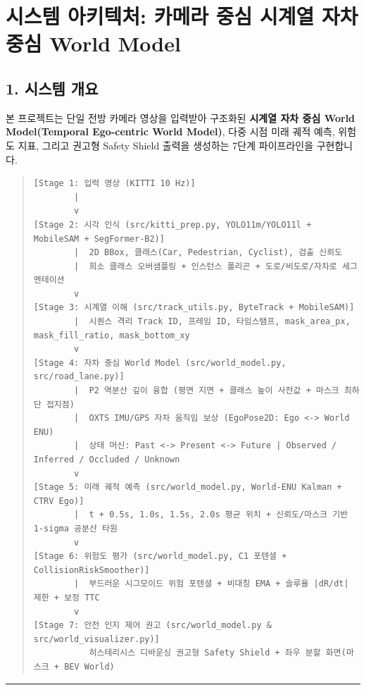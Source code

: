 \documentclass[10.5pt,a4paper]{article}
\begin{document}
\section{시스템 아키텍처: 카메라 중심 시계열 자차 중심 World Model}

\subsection{1. 시스템 개요}

본 프로젝트는 단일 전방 카메라 영상을 입력받아 구조화된 \textbf{시계열 자차 중심 World Model(Temporal Ego-centric World Model)}, 다중 시점 미래 궤적 예측, 위험도 지표, 그리고 권고형 Safety Shield 출력을 생성하는 7단계 파이프라인을 구현합니다.


\begin{quote}\begin{footnotesize}\begin{verbatim}
[Stage 1: 입력 영상 (KITTI 10 Hz)]
        |
        v
[Stage 2: 시각 인식 (src/kitti_prep.py, YOLO11m/YOLO11l + MobileSAM + SegFormer-B2)]
        |  2D BBox, 클래스(Car, Pedestrian, Cyclist), 검출 신뢰도
        |  희소 클래스 오버샘플링 + 인스턴스 폴리곤 + 도로/비도로/자차로 세그멘테이션
        v
[Stage 3: 시계열 이해 (src/track_utils.py, ByteTrack + MobileSAM)]
        |  시퀀스 격리 Track ID, 프레임 ID, 타임스탬프, mask_area_px, mask_fill_ratio, mask_bottom_xy
        v
[Stage 4: 자차 중심 World Model (src/world_model.py, src/road_lane.py)]
        |  P2 역분산 깊이 융합 (평면 지면 + 클래스 높이 사전값 + 마스크 최하단 접지점)
        |  OXTS IMU/GPS 자차 움직임 보상 (EgoPose2D: Ego <-> World ENU)
        |  상태 머신: Past <-> Present <-> Future | Observed / Inferred / Occluded / Unknown
        v
[Stage 5: 미래 궤적 예측 (src/world_model.py, World-ENU Kalman + CTRV Ego)]
        |  t + 0.5s, 1.0s, 1.5s, 2.0s 평균 위치 + 신뢰도/마스크 기반 1-sigma 공분산 타원
        v
[Stage 6: 위험도 평가 (src/world_model.py, C1 포텐셜 + CollisionRiskSmoother)]
        |  부드러운 시그모이드 위험 포텐셜 + 비대칭 EMA + 슬루율 |dR/dt| 제한 + 보정 TTC
        v
[Stage 7: 안전 인지 제어 권고 (src/world_model.py & src/world_visualizer.py)]
           히스테리시스 디바운싱 권고형 Safety Shield + 좌우 분할 화면(마스크 + BEV World)
\end{verbatim}\end{footnotesize}\end{quote}

\par\noindent\rule{\textwidth}{0.4pt}\par\medskip
\end{document}
